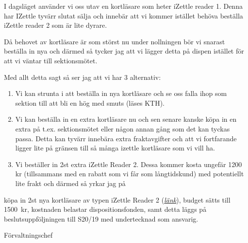 \documentclass[10pt]{article}
\begin{document}
I dagsläget använder vi oss utav en kortläsare som heter iZettle reader 1. Denna har IZettle tyvärr slutat sälja och innebär att vi kommer istället behöva beställa iZettle reader 2 som är lite dyrare.

Då behovet av kortläsare är som störst nu under nollningen bör vi snarast beställa in nya och därmed så tycker jag att vi lägger detta på dispen istället för att vi väntar till sektionsmötet.


Med allt detta sagt så ser jag att vi har 3 alternativ:

\begin{enumerate}
  \item Vi kan strunta i att beställa in nya kortläsare och se oss falla ihop som sektion till att bli en hög med smuts (läses KTH).
  \item Vi kan beställa in en extra kortläsare nu och sen senare kanske köpa in en extra på t.ex. sektionsmötet eller någon annan gång som det kan tyckas passa. Detta kan tyvärr innebära extra fraktavgifter och att vi fortfarande ligger lite på gränsen till så många izettle kortläsare som vi vill ha.
   \item Vi beställer in 2st extra iZettle Reader 2. Dessa kommer kosta ungefär 1200 kr (tillsammans med en rabatt som vi får som långtidskund) med potentiellt lite frakt och därmed så yrkar jag på
\end{enumerate}

    \begin{attsatser}
        \att köpa in 2st nya kortläsare av typen iZettle Reader 2  (\href{https://www.izettle.com/se/kortterminal}{\textit{länk}}),
        \att budget sätts till \SI{1500}{kr},
        \att kostnaden belastar dispositionsfonden, samt
        \att detta läggs på beslutsuppföljningen till S20/19 med undertecknad som ansvarig. 
    \end{attsatser}

    \begin{signatures}{1}
    \textit{\ist}
    \signature{Henrik Ramström}{Förvaltningschef}
    \end{signatures}

    
\end{document}
